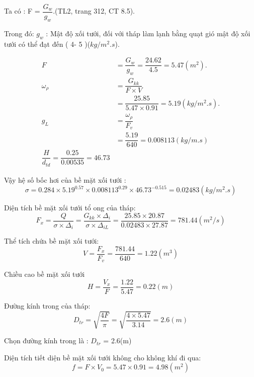 \newpage
Ta có : F = $\dfrac{G_{w}}{g_{w}}$.(TL2, trang 312, CT 8.5).

Trong đó:
$g_{w}$ : Mật độ xối tưới, đối với tháp làm lạnh bằng quạt gió mật độ xối tưới có thể đạt đến ( 4- 5 )($kg/m^2.s$).

\begin{equation*}
	\begin{split}
		F& = \dfrac{G_{w}}{g_{w}}= \dfrac{24.62}{4.5} = 5.47(m^2).\\
		\omega_{\rho}& = \dfrac{G_{kk}}{F \times V}\\ 
		             & = \dfrac{25.85}{5.47 \times 0.91} = 5.19(kg/m^2.s).\\
		g_{L}& = \dfrac{\omega_{\rho}}{F_{v}}\\
		     & = \dfrac{5.19}{640}=0.008113(kg/m.s) \\ 
		\dfrac{H}{d_{td}} = \dfrac{0.25}{0.00535}= 46.73             
	\end{split}
\end{equation*}

Vậy hệ số bốc hơi của bề mặt xối tưới :
\begin{equation*}
	\sigma = 0.284 \times 5.19^{0.57} \times 0.008113^{0.29} \times 46.73^{-0.515} = 0.02483 (kg/m^2.s)
\end{equation*}

Diện tích bề mặt xối tưới tổ ong của tháp:
\begin{equation*}
	F_{x} = \dfrac{Q}{\sigma \times \Delta_{i}} =\dfrac{G_{kk} \times \Delta_{i}}{\sigma \times \Delta_{iL}} = \dfrac{25.85 \times 20.87}{0.02483 \times 27.87} = 781.44(m^2/s)
\end{equation*}

Thể tích chứa bề mặt xối tưới:
\begin{equation*}
	V = \dfrac{F_{x}}{F_{v}} = \dfrac{781.44}{640} = 1.22(m^3)
\end{equation*}

Chiều cao bề mặt xối tưới
\begin{equation*}
	H = \dfrac{V_{x}}{F}=\dfrac{1.22}{5.47} =0.22(m)
\end{equation*}

Đường kính trong của tháp:
\begin{equation*}
	D_{tr} = \sqrt{\dfrac{4F}{\pi}} = \sqrt{\dfrac{4 \times 5.47}{3.14}} =2.6(m)
\end{equation*}

Chọn đường kính trong là : $D_{tr}$ = 2.6(m)

Diện tích tiết diện bề mặt xối tưới không cho không khí đi qua:
\begin{equation*}
	f = F \times V_{0} = 5.47 \times 0.91 = 4.98(m^2)
\end{equation*}

